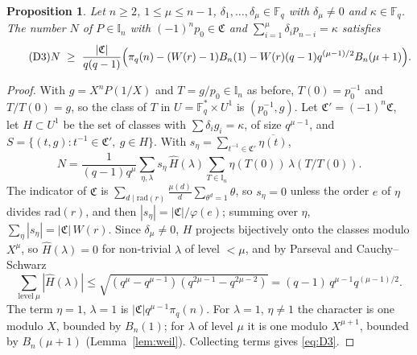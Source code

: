 \documentclass[11pt,a4paper]{amsart}
\newtheorem{proposition}[theorem]{Proposition}
\theoremstyle{remark}
\newcommand{\Fq}{\mathbb{F}_q}
\newcommand{\I}{\mathbb{I}}
\newcommand{\fC}{\mathfrak{C}}
\begin{document}
\begin{proposition}\label{prop:D3}
Let $n\ge2$, $1\le\mu\le n-1$, $\delta_1,\dots,\delta_\mu\in\Fq$ with $\delta_\mu\ne0$ and $\kappa\in\Fq$. The
number $N$ of $P\in\I_n$ with $(-1)^np_0\in\fC$ and $\sum_{i=1}^\mu\delta_ip_{n-i}=\kappa$ satisfies
\begin{equation}\label{eq:D3}\tag{D3}
N\ \ge\ \frac{|\fC|}{q(q-1)}\Bigl(\pi_q(n)-(W(r)-1)B_n(1)-W(r)(q-1)q^{(\mu-1)/2}B_n(\mu+1)\Bigr).
\end{equation}
\end{proposition}
\begin{proof}
With $g=X^nP(1/X)$ and $T=g/p_0\in\I_n$ as before, $T(0)=p_0^{-1}$ and $T/T(0)=g$, so the class of $T$ in
$U=\Fq^*\times U^1$ is $(p_0^{-1},g)$. Let $\fC'=(-1)^n\fC$, let $H\subset U^1$ be the set of classes with
$\sum\delta_ig_i=\kappa$, of size $q^{\mu-1}$, and $S=\{(t,g):t^{-1}\in\fC',\ g\in H\}$. With
$s_\eta=\sum_{t^{-1}\in\fC'}\overline{\eta(t)}$,
\[
N=\frac1{(q-1)q^\mu}\sum_{\eta,\lambda}s_\eta\,\widehat H(\lambda)\sum_{T\in\I_n}\eta(T(0))\,\lambda(T/T(0)).
\]
The indicator of $\fC$ is $\sum_{d\mid\mathrm{rad}(r)}\frac{\mu(d)}d\sum_{\theta^d=1}\theta$, so $s_\eta=0$
unless the order $e$ of $\eta$ divides $\mathrm{rad}(r)$, and then $|s_\eta|=|\fC|/\varphi(e)$; summing over
$\eta$, $\sum_\eta|s_\eta|=|\fC|\,W(r)$. Since $\delta_\mu\ne0$, $H$ projects bijectively onto the classes modulo
$X^\mu$, so $\widehat H(\lambda)=0$ for non-trivial $\lambda$ of level $<\mu$, and by Parseval and
Cauchy--Schwarz
\[
\sum_{\mathrm{level}\ \mu}|\widehat H(\lambda)|\le\sqrt{(q^\mu-q^{\mu-1})(q^{2\mu-1}-q^{2\mu-2})}=(q-1)\,q^{\mu-1}q^{(\mu-1)/2}.
\]
The term $\eta=1$, $\lambda=1$ is $|\fC|q^{\mu-1}\pi_q(n)$. For $\lambda=1$, $\eta\ne1$ the character is one
modulo $X$, bounded by $B_n(1)$; for $\lambda$ of level $\mu$ it is one modulo $X^{\mu+1}$, bounded by
$B_n(\mu+1)$ (Lemma~\ref{lem:weil}). Collecting terms gives \eqref{eq:D3}.
\end{proof}
\end{document}
